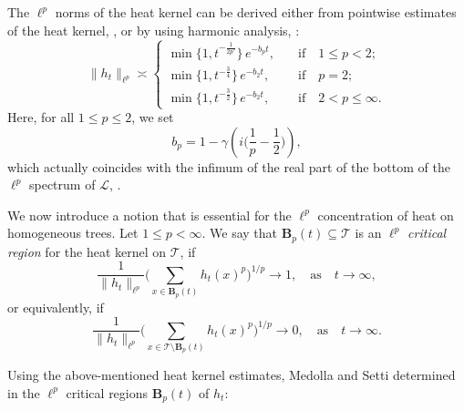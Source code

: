 \documentclass[11pt,a4paper,reqno]{amsart}
\renewcommand\mathcal{\mathscr}
\theoremstyle{plain}
\theoremstyle{remark}
\theoremstyle{definition}
\theoremstyle{remark}
\numberwithin{equation}{section}
\begin{document}
    The $\ell^p$ norms of the heat kernel can be derived either from pointwise estimates of the heat kernel, \cite[p.1740]{MedSe}, or by using harmonic analysis, \cite[Lemma 2.1]{CMS}:
    \begin{equation}\label{eq:heatLpnorms}
        \|h_t\|_{\ell^p}\asymp \begin{cases}
            \min\{1, t^{-\frac{1}{2p'}}\}\,e^{-b_p t}, \quad &\text{if} \quad 1\leq p <2;\\
            \min\{1, t^{-\frac{3}{4}}\}\,e^{-b_2 t}, \quad &\text{if} \quad p=2;\\
           \min\{1, t^{-\frac{3}{2}}\}\,e^{-b_2 t}, \quad &\text{if} \quad 2 < p \leq \infty.
        \end{cases}
    \end{equation}
	Here, for all $1\leq p\leq 2$, we set
    \[
    b_p=1-\gamma\left( i \Big(\frac{1}{p}-\frac{1}{2}\Big)\right),
    \]
    which actually coincides with the infimum of the real part of the bottom of the $\ell^p$ spectrum of $\mathcal{L}$, \cite[p.4275]{CMS}.
    
	We now introduce a notion that is essential for the $\ell^p$ concentration of heat on homogeneous trees. Let $1\leq p < \infty$. We say that $\textbf{B}_p(t)\subseteq \mathcal{T}$ is an $\ell^p$ \emph{critical region} for the heat kernel on $\mathcal{T}$, if
	\begin{equation}\label{eq:critical}
	\frac{1}{\|h_t\|_{\ell^p}}\Bigg(\sum_{x\in\textbf{B}_p(t)}h_t(x)^p\Bigg)^{1/p}\to 1, \quad \text{as} \quad  t\to \infty, 
	\end{equation}
	or equivalently, if 
	\[
	\frac{1}{\|h_t\|_{\ell^p}}\Bigg(\sum_{x\in\mathcal{T}\setminus \textbf{B}_p(t)}h_t(x)^p\Bigg)^{1/p}\to 0, \quad \text{as} \quad  t\to \infty.
	\]
    
	Using the above-mentioned heat kernel estimates, Medolla and Setti determined in \cite{MedSe} the $\ell^p$ critical regions $\textbf{B}_p(t)$ of $h_t$:
    
\end{document}
